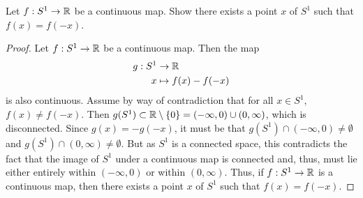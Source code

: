 \begin{exercise}[ID=3.24.2]
  Let $f: S^1 \rightarrow \mathbb{R}$ be a continuous map.
  Show there exists a point $x$ of $S^1$ such that $f(x) = f(-x)$.
\end{exercise}
%
\begin{solution}
  \begin{proof}
    Let $f: S^1 \rightarrow \mathbb{R}$ be a continuous map.
    Then the map
    \begin{align*}
      g: S^1  &\rightarrow \mathbb{R} \\
            x &\mapsto f(x) - f(-x)
    \end{align*}
    is also continuous.
    Assume by way of contradiction that for all $x \in S^1$, $f(x) \neq f(-x)$.
    Then $g(S^1) \subset \mathbb{R} \setminus \{0\} = (-\infty, 0) \cup (0, \infty)$, which is disconnected.
    Since $g(x) = -g(-x)$, it must be that $g(S^1) \cap (-\infty, 0) \neq \emptyset$ and $g(S^1) \cap (0, \infty) \neq \emptyset$.
    But as $S^1$ is a connected space, this contradicts the fact that the image of $S^1$ under a continuous map is connected and, thus, must lie either entirely within $(-\infty, 0)$ or within $(0, \infty)$.
    Thus, if $f: S^1 \rightarrow \mathbb{R}$ is a continuous map, then there exists a point $x$ of $S^1$ such that $f(x) = f(-x)$.
  \end{proof}
\end{solution}
\newpage

